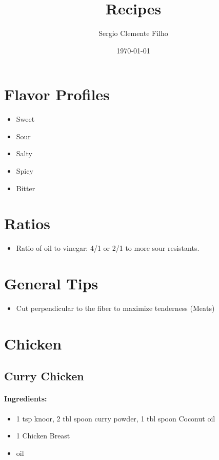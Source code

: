 \documentclass{article}
\title{Recipes}
\author{Sergio Clemente Filho}
\date{\today}
\begin{document}
\maketitle

\newpage

\tableofcontents{}

\newpage

\section{Flavor Profiles}
\begin{itemize}
	\item Sweet
	\item Sour
	\item Salty
	\item Spicy
	\item Bitter
\end{itemize}

	\section{Ratios}
\begin{itemize}
	\item Ratio of oil to vinegar: 4/1 or 2/1 to more sour resistants.
\end{itemize}

\section{General Tips}
\begin{itemize}
	\item Cut perpendicular to the fiber to maximize tenderness (Meats)
\end{itemize}






\section{Chicken}


\subsection{Curry Chicken}

\paragraph{Ingredients:}
\begin{itemize}
    \item 1 tsp knoor, 2 tbl spoon curry powder, 1 tbl spoon Coconut oil
    \item 1 Chicken Breast
    \item oil
\end{itemize}
\end{document}
